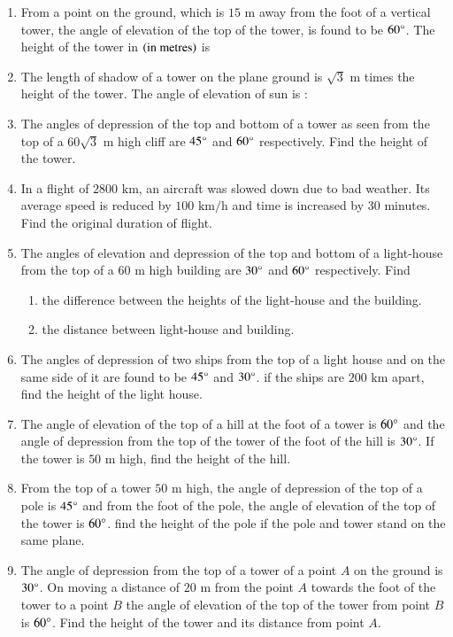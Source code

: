 \begin{enumerate}
\hfill{}\item From a point on the ground, which is $15\text{ m}$ away from the foot of a vertical tower, the angle of elevation of the top of the tower, is found to be $60\degree$. The height of the tower in $\left(\text{in metres}\right)$ is 
\hfill{}\item The length of shadow of a tower on the plane ground is $\sqrt 3 \text{ m}$ times the height of the tower. The angle of elevation of sun is : 
\hfill{}\item The angles of depression of the top and bottom of a tower as seen from the top of a $60\sqrt 3 \text{ m}$ high cliff are $45\degree$ and $60\degree$ respectively. Find the height of the tower. 
\hfill{}\item In a flight of $2800 \text{ km}$, an aircraft was slowed down due to bad weather. Its average speed is reduced by $100 \text{ km/h}$ and time is increased by $30$ minutes. Find the original duration of flight. 
\hfill{}\item The angles of elevation and depression of the top and bottom of a light-house from the top of a $60 \text{ m}$ high building are $30\degree$ and $60\degree$ respectively. Find 
\begin{enumerate}
\item the difference between the heights of the light-house and the building. 
\item the distance between light-house and building. 
\end{enumerate}
\hfill{}\item The angles of depression of two ships from the top of a light house and on the same side of it are found to be $45\degree$ and $30\degree$. if the ships are $200 \text{ km}$ apart, find the height of the light house. 
\hfill{}\item The angle of elevation of the top of a hill at the foot of a tower is $60\degree$ and the angle of depression from the top of the tower of the foot of the hill is $30\degree$. If the tower is $50\text{ m}$ high, find the height of the hill. 
\hfill{}\item From the top of a tower $50\text{ m}$ high, the angle of depression of the top of a pole is $45\degree$ and from the foot of the pole, the angle of elevation of the top of the tower is $60\degree$. find the height of the pole if the pole and tower stand on the same plane. 
\hfill{}\item The angle of depression from the top of a tower of a point $A$ on the ground is $30\degree$. On moving a distance of $20\text{ m}$ from the point $A$ towards the foot of the tower to a point $B$ the angle of elevation of the top of the tower from point $B$ is $60\degree$. Find the height of the tower and its distance from point $A$.

\end{enumerate}
